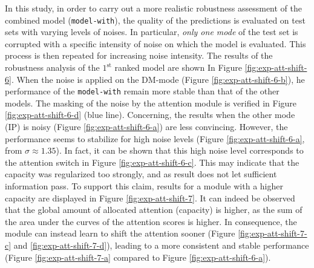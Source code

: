 In this study, in order to carry out a more realistic robustness assessment of the combined model (\texttt{model-with}), the quality of the predictions is evaluated on test sets with varying levels of noises. In particular, \textit{only one mode} of the test set is corrupted with a specific intensity of noise on which the model is evaluated. This process is then repeated for increasing noise intensity. The results of the robustness analysis of the $1^\text{st}$ ranked model are shown In Figure \ref{fig:exp-att-shift-6}. When the noise is applied on the DM-mode (Figure \ref{fig:exp-att-shift-6-b}), he performance of the \texttt{model-with} remain more stable than that of the other models. The masking of the noise by the attention module is verified in Figure \ref{fig:exp-att-shift-6-d} (blue line). Concerning, the results when the other mode (IP) is noisy (Figure \ref{fig:exp-att-shift-6-a}) are less convincing. However, the performance seems to stabilize for high noise levels (Figure \ref{fig:exp-att-shift-6-a}, from $\sigma \approx 1.35$). In fact, it can be shown that this high noise level corresponds to the attention switch in Figure \ref{fig:exp-att-shift-6-c}. This may indicate that the capacity was regularized too strongly, and as result does not let sufficient information pass. To support this claim, results for a module with a higher capacity are displayed in Figure \ref{fig:exp-att-shift-7}. It can indeed be observed that the global amount of allocated attention (capacity) is higher, as the sum of the area under the curves of the attention scores is higher. In consequence, the module can instead learn to shift the attention sooner (Figure \ref{fig:exp-att-shift-7-c} and \ref{fig:exp-att-shift-7-d}), leading to a more consistent and stable performance (Figure \ref{fig:exp-att-shift-7-a} compared to Figure \ref{fig:exp-att-shift-6-a}). 

